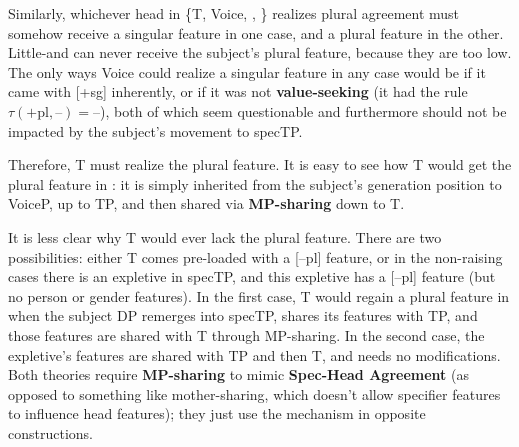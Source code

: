 Similarly, whichever head in \{T, Voice, \lv, \rt{}\} realizes plural agreement must somehow receive a singular feature in one case, and a plural feature in the other. Little-\lv and \rt{} can never receive the subject's plural feature, because they are too low. The only ways Voice could realize a singular feature in any case would be if it came with [+sg] inherently, or if it was not \textbf{value-seeking} (it had the rule $\tau(\text{+pl}, \text{–}) = \text{–}$), both of which seem questionable and furthermore should not be impacted by the subject's movement to specTP.

Therefore, T must realize the plural feature. It is easy to see how T would get the plural feature in : it is simply inherited from the subject's generation position to VoiceP, up to TP, and then shared via \textbf{MP-sharing} down to T.

It is less clear why T would ever lack the plural feature. There are two possibilities: either T comes pre-loaded with a [–pl] feature, or in the non-raising cases there is an expletive in specTP, and this expletive has a [–pl] feature (but no person or gender features). In the first case, T would regain a plural feature in  when the subject DP remerges into specTP, shares its features with TP, and those features are shared with T through MP-sharing. In the second case, the expletive's features are shared with TP and then T, and  needs no modifications. Both theories require \textbf{MP-sharing} to mimic \textbf{Spec-Head Agreement} (as opposed to something like mother-sharing, which doesn't allow specifier features to influence head features); they just use the mechanism in opposite constructions.
